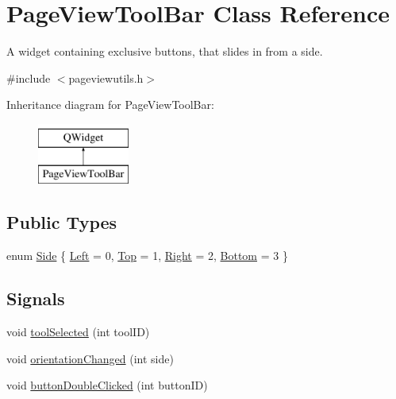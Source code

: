 \hypertarget{classPageViewToolBar}{\section{Page\+View\+Tool\+Bar Class Reference}
\label{classPageViewToolBar}
}


A widget containing exclusive buttons, that slides in from a side.  




{\ttfamily \#include $<$pageviewutils.\+h$>$}

Inheritance diagram for Page\+View\+Tool\+Bar\+:\begin{figure}[H]
\begin{center}
\leavevmode
\includegraphics[height=2.000000cm]{classPageViewToolBar}
\end{center}
\end{figure}
\subsection*{Public Types}
\begin{DoxyCompactItemize}
\item 
enum \hyperlink{classPageViewToolBar_a6410ac0bc9e35fba1314cfd6d7049385}{Side} \{ \hyperlink{classPageViewToolBar_a6410ac0bc9e35fba1314cfd6d7049385ae2896772e25f563086c120f64857fa6c}{Left} = 0, 
\hyperlink{classPageViewToolBar_a6410ac0bc9e35fba1314cfd6d7049385aa0a8431d0106205e2fd3d2122ec3a2e3}{Top} = 1, 
\hyperlink{classPageViewToolBar_a6410ac0bc9e35fba1314cfd6d7049385a67d6065aeb6f242a23f9b9ae2426b136}{Right} = 2, 
\hyperlink{classPageViewToolBar_a6410ac0bc9e35fba1314cfd6d7049385ab20155b7a2791a54d63c84d188b67a43}{Bottom} = 3
 \}
\end{DoxyCompactItemize}
\subsection*{Signals}
\begin{DoxyCompactItemize}
\item 
void \hyperlink{classPageViewToolBar_a89a0dd0ea468edd6e26b1525e70fedac}{tool\+Selected} (int tool\+I\+D)
\item 
void \hyperlink{classPageViewToolBar_acee9081de306e38df2c8a1c02aac0b7e}{orientation\+Changed} (int side)
\item 
void \hyperlink{classPageViewToolBar_ac91411a9b2de2340cbb00ae92cea49d5}{button\+Double\+Clicked} (int button\+I\+D)
\end{DoxyCompactItemize}
